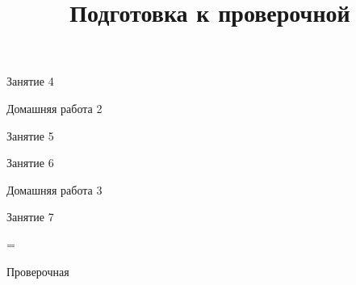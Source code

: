 \begin{class}[number=4]
	\begin{listofex}
		\item Занятие 4
	\end{listofex}
\end{class}

\begin{homework}[number=2]
	\begin{listofex}
		\item Домашняя работа 2
	\end{listofex}
\end{homework}

\begin{class}[number=5]
	\begin{listofex}
		\item Занятие 5
	\end{listofex}
\end{class}

\begin{class}[number=6]
	\begin{listofex}
		\item Занятие 6
	\end{listofex}
\end{class}

\begin{homework}[number=3]
	\begin{listofex}
		\item Домашняя работа 3
	\end{listofex}
\end{homework}

\begin{class}[number=7]
	\title{Подготовка к проверочной}
	\begin{listofex}
		\item Занятие 7
	\end{listofex}
\end{class}

=%
\begin{exam}
	\begin{listofex}
		\item Проверочная
	\end{listofex}
\end{exam}

